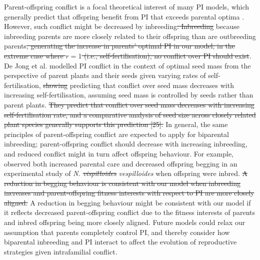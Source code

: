 \documentclass[12pt]{article}
\begin{document}
Parent-offspring conflict is a focal theoretical interest of many PI models, which generally predict that offspring benefit from PI that exceeds parental optima \cite[][]{Macnair1978, Parker1978, Parker1985, DeJong2005}. However, such conflict might be decreased by inbreeding{\color{red}\st{. Inbreeding}} {\color{blue}because inbreeding} parents are more closely related to their offspring than are outbreeding parents{\color{red}\st{, generating the increase in parents' optimal PI in our model; in the extreme case where $r=1$ (i.e., self-fertilisation), no conflict over PI should exist}}. De Jong et al. \cite{DeJong2005} modelled PI conflict in the context of optimal seed mass from the perspective of parent plants and their seeds given varying rates of self-fertilisation, {\color{red}\st{showing}} predicting that conflict over seed mass decreases with increasing self-fertilisation, assuming seed mass is controlled by seeds rather than parent plants.{\color{red}\st{ They predict that conflict over seed mass decreases with increasing self-fertilisation rate, and a comparative analysis of seed size across closely related plant species generally supports this prediction [25].}} In general, the same principles of parent-offspring conflict are expected to apply for biparental inbreeding; parent-offspring conflict should decrease with increasing inbreeding, and reduced conflict might in turn affect offspring behaviour. For example, \cite{Mattey2014} observed both increased parental care and decreased offspring begging in an experimental study of \textit{N. {\color{red}\st{vispilloides}}} {\color{blue}\textit{vespilloides}} when offspring were inbred. {\color{red}\st{A reduction in begging behaviour is consistent with our model when inbreeding increases and parent-offspring fitness interests with respect to PI are more closely aligned.}} {\color{blue}A reduction in begging behaviour might be consistent with our model if it reflects decreased parent-offspring conflict due to the fitness interests of parents and inbred offspring being more closely aligned.} Future models could relax our assumption that parents completely control PI, and thereby consider how biparental inbreeding and PI interact to affect the evolution of reproductive strategies given intrafamilial conflict.
\end{document}

